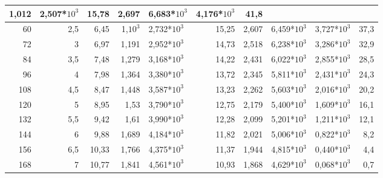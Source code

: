 \begin{table}[H]
{\begin{tabular}{|rr|rrl|rrl|l|r|}
  \multicolumn{1}{r|}{1,012} &
  2,507*$10^3$ &
  \multicolumn{1}{r|}{15,78} &
  \multicolumn{1}{r|}{2,697} &
  6,683*$10^3$ &
  4,176*$10^3$ &
  41,8 \\ \hline
\multicolumn{1}{|r|}{60} &
  2,5 &
  \multicolumn{1}{r|}{6,45} &
  \multicolumn{1}{r|}{1,$10^3$} &
  2,732*$10^3$ &
  \multicolumn{1}{r|}{15,25} &
  \multicolumn{1}{r|}{2,607} &
  6,459*$10^3$ &
  3,727*$10^3$ &
  37,3 \\ \hline
\multicolumn{1}{|r|}{72} &
  3 &
  \multicolumn{1}{r|}{6,97} &
  \multicolumn{1}{r|}{1,191} &
  2,952*$10^3$ &
  \multicolumn{1}{r|}{14,73} &
  \multicolumn{1}{r|}{2,518} &
  6,238*$10^3$ &
  3,286*$10^3$ &
  32,9 \\ \hline
\multicolumn{1}{|r|}{84} &
  3,5 &
  \multicolumn{1}{r|}{7,48} &
  \multicolumn{1}{r|}{1,279} &
  3,168*$10^3$ &
  \multicolumn{1}{r|}{14,22} &
  \multicolumn{1}{r|}{2,431} &
  6,022*$10^3$ &
  2,855*$10^3$ &
  28,5 \\ \hline
\multicolumn{1}{|r|}{96} &
  4 &
  \multicolumn{1}{r|}{7,98} &
  \multicolumn{1}{r|}{1,364} &
  3,380*$10^3$ &
  \multicolumn{1}{r|}{13,72} &
  \multicolumn{1}{r|}{2,345} &
  5,811*$10^3$ &
  2,431*$10^3$ &
  24,3 \\ \hline
\multicolumn{1}{|r|}{108} &
  4,5 &
  \multicolumn{1}{r|}{8,47} &
  \multicolumn{1}{r|}{1,448} &
  3,587*$10^3$ &
  \multicolumn{1}{r|}{13,23} &
  \multicolumn{1}{r|}{2,262} &
  5,603*$10^3$ &
  2,016*$10^3$ &
  20,2 \\ \hline
\multicolumn{1}{|r|}{120} &
  5 &
  \multicolumn{1}{r|}{8,95} &
  \multicolumn{1}{r|}{1,53} &
  3,790*$10^3$ &
  \multicolumn{1}{r|}{12,75} &
  \multicolumn{1}{r|}{2,179} &
  5,400*$10^3$ &
  1,609*$10^3$ &
  16,1 \\ \hline
\multicolumn{1}{|r|}{132} &
  5,5 &
  \multicolumn{1}{r|}{9,42} &
  \multicolumn{1}{r|}{1,61} &
  3,990*$10^3$ &
  \multicolumn{1}{r|}{12,28} &
  \multicolumn{1}{r|}{2,099} &
  5,201*$10^3$ &
  1,211*$10^3$ &
  12,1 \\ \hline
\multicolumn{1}{|r|}{144} &
  6 &
  \multicolumn{1}{r|}{9,88} &
  \multicolumn{1}{r|}{1,689} &
  4,184*$10^3$ &
  \multicolumn{1}{r|}{11,82} &
  \multicolumn{1}{r|}{2,021} &
  5,006*$10^3$ &
  0,822*$10^3$ &
  8,2 \\ \hline
\multicolumn{1}{|r|}{156} &
  6,5 &
  \multicolumn{1}{r|}{10,33} &
  \multicolumn{1}{r|}{1,766} &
  4,375*$10^3$ &
  \multicolumn{1}{r|}{11,37} &
  \multicolumn{1}{r|}{1,944} &
  4,815*$10^3$ &
  0,440*$10^3$ &
  4,4 \\ \hline
\multicolumn{1}{|r|}{168} &
  7 &
  \multicolumn{1}{r|}{10,77} &
  \multicolumn{1}{r|}{1,841} &
  4,561*$10^3$ &
  \multicolumn{1}{r|}{10,93} &
  \multicolumn{1}{r|}{1,868} &
  4,629*$10^3$ &
  0,068*$10^3$ &
  0,7 \\ \hline
\end{tabular}%
}
\end{table}

